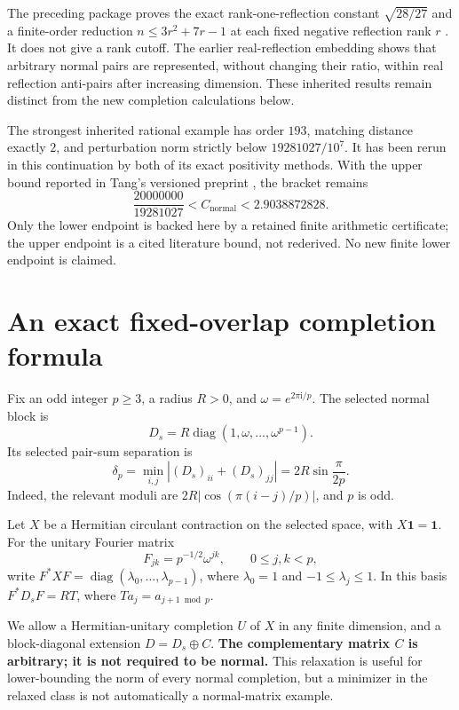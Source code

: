 \documentclass[11pt]{article}
\theoremstyle{remark}
\newcommand{\Cstar}{C_{\mathrm{normal}}}
\newcommand{\ii}{\mathrm{i}}
\newcommand{\diag}{\operatorname{diag}}
\begin{document}
The preceding package proves the exact rank-one-reflection constant $\sqrt{28/27}$ and a finite-order reduction $n\le 3r^2+7r-1$ at each fixed negative reflection rank $r$ \cite{prior4}. It does not give a rank cutoff. The earlier real-reflection embedding shows that arbitrary normal pairs are represented, without changing their ratio, within real reflection anti-pairs after increasing dimension. These inherited results remain distinct from the new completion calculations below.

The strongest inherited rational example has order $193$, matching distance exactly $2$, and perturbation norm strictly below $19281027/10^7$. It has been rerun in this continuation by both of its exact positivity methods. With the upper bound reported in Tang's versioned preprint \cite{tang}, the bracket remains
\begin{equation}\label{eq:bracket}
 \boxed{\quad \frac{20000000}{19281027}<\Cstar<2.9038872828.\quad}
\end{equation}
Only the lower endpoint is backed here by a retained finite arithmetic certificate; the upper endpoint is a cited literature bound, not rederived. No new finite lower endpoint is claimed.

\section{An exact fixed-overlap completion formula}
Fix an odd integer $p\ge3$, a radius $R>0$, and $\omega=e^{2\pi\ii/p}$. The selected normal block is
\[
 D_s=R\diag(1,\omega,\ldots,\omega^{p-1}).
\]
Its selected pair-sum separation is
\begin{equation}\label{eq:polygon-gap}
 \delta_p=\min_{i,j}|(D_s)_{ii}+(D_s)_{jj}|
 =2R\sin\frac{\pi}{2p}.
\end{equation}
Indeed, the relevant moduli are $2R|\cos(\pi(i-j)/p)|$, and $p$ is odd.

Let $X$ be a Hermitian circulant contraction on the selected space, with $X\mathbf1=\mathbf1$. For the unitary Fourier matrix
\[
 F_{jk}=p^{-1/2}\omega^{jk},\qquad 0\le j,k<p,
\]
write $F^*XF=\diag(\lambda_0,\ldots,\lambda_{p-1})$, where $\lambda_0=1$ and $-1\le\lambda_j\le1$. In this basis $F^*D_sF=RT$, where $T a_j=a_{j+1\bmod p}$.

We allow a Hermitian-unitary completion $U$ of $X$ in any finite dimension, and a block-diagonal extension $D=D_s\oplus C$. \textbf{The complementary matrix $C$ is arbitrary; it is not required to be normal.} This relaxation is useful for lower-bounding the norm of every normal completion, but a minimizer in the relaxed class is not automatically a normal-matrix example.
\end{document}
